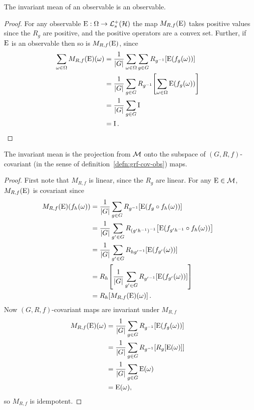 \begin{lem}\label{lem:inv-mean-obs-to-obs}
  The invariant mean of an observable is an observable.
  \begin{proof}
    For any observable $\ope:\Omega\to\posops[\hcal]$ the map $M_{R,f}(\operatorname{E})$ takes positive values since the $R_g$ are positive, and the positive operators are a convex set. Further, if $\operatorname{E}$ is an observable then so is $M_{R,f}(\operatorname{E})$, since
    \begin{align}
      \sum_{\omega\in\Omega} M_{R,f}(\operatorname{E})(\omega) &= \frac{1}{{\left\lvert{G}\right\rvert}} \sum_{\omega\in\Omega} \sum_{g\in G} R_{g^{-1}}\! \left[\operatorname{E}(f_g(\omega))\right]\\
                                                   &= \frac{1}{{\left\lvert{G}\right\rvert}} \sum_{g\in G} R_{g^{-1}}\! \left[\sum_{\omega\in\Omega}\operatorname{E}(f_g(\omega))\right]\\
                                                   &= \frac{1}{{\left\lvert{G}\right\rvert}} \sum_{g\in G} \operatorname{I}\\
                                                   &= \operatorname{I}.
    \end{align}
  \end{proof}
\end{lem}
\begin{lem}\label{lem:inv-mean-proj}
  The invariant mean is the projection from $\mathcal{M}$ onto the subspace of $(G,R,f)$-covariant (in the sense of definition~\ref{defn:grf-cov-obs})
 maps.
  \begin{proof}
    First note that $M_{R,f}$ is linear, since the $R_g$ are linear. For any $\operatorname{E}\in\mathcal{M}$, $M_{R,f}(\operatorname{E})$ is covariant since
    \begin{align}
      M_{R,f}(\operatorname{E})(f_h(\omega)) &= \frac{1}{{\left\lvert{G}\right\rvert}} \sum_{g\in G} R_{g^{-1}}\! \left[\operatorname{E}(f_g\circ f_h(\omega))\right]\\
                                 &= \frac{1}{{\left\lvert{G}\right\rvert}} \sum_{g^\prime\in G} R_{{(g^\prime h^{-1})}^{-1}}\! \left[\operatorname{E}(f_{g^\prime h^{-1}}\circ f_h(\omega))\right]\\
                                 &= \frac{1}{{\left\lvert{G}\right\rvert}} \sum_{g^\prime\in G} R_{h{g^\prime}^{-1}} \! \left[\operatorname{E}(f_{g^\prime}(\omega))\right]\\
                                 &= R_h\!\left[\frac{1}{{\left\lvert{G}\right\rvert}} \sum_{g^\prime\in G} R_{{g^\prime}^{-1}} \! \left[\operatorname{E}(f_{g^\prime}(\omega))\right]\right]\\
                                 &= R_h\!\left[M_{R,f}(\operatorname{E})(\omega)\right].
    \end{align}
    Now $(G, R,f)$-covariant maps are invariant under $M_{R,f}$
    \begin{align}
      M_{R,f}(\operatorname{E})(\omega) &= \frac{1}{{\left\lvert{G}\right\rvert}}\sum_{g\in G} R_{g^{-1}}\! \left[\operatorname{E}(f_g(\omega))\right]\\
                            &= \frac{1}{{\left\lvert{G}\right\rvert}}\sum_{g\in G} R_{g^{-1}}\! \left[R_{g}\!\left[\operatorname{E}(\omega)\right]\right]\\
                            &= \frac{1}{{\left\lvert{G}\right\rvert}}\sum_{g\in G} \operatorname{E}(\omega)\\
                            &= \operatorname{E}(\omega),
    \end{align}
    so $M_{R,f}$ is idempotent.
  \end{proof}
\end{lem}
